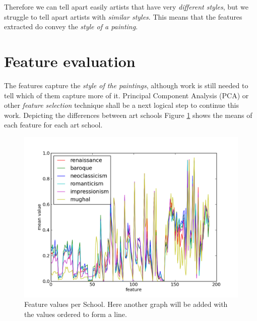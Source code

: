 \documentclass[11pt,a4paper,twoside,openright,draft]{report}
\begin{document}
\begin{multicols}{2}
Therefore we can tell apart easily artists that have very \emph{different
styles}, but we struggle to tell apart artists with \emph{similar styles}.
This means that the features extracted do convey the \emph{style of a
painting}.

\section{Feature evaluation}

The features capture the \emph{style of the paintings}, although work is still
needed to tell which of them capture more of it.  Principal Component Analysis
(PCA) or other \emph{feature selection} technique shall be a next logical step
to continue this work.  Depicting the differences between art schools Figure
\ref{fig:school} shows the means of each feature for each art school.

\begin{figure}[tbp]
\centering
\includegraphics[width=\textwidth]{school-graph}
\caption[Feature Values]{Feature values per School. Here another graph will be
added with the values ordered to form a line.}
\label{fig:school}
\end{figure}


\end{multicols}

%
%
%
%
%
%
\end{document}
